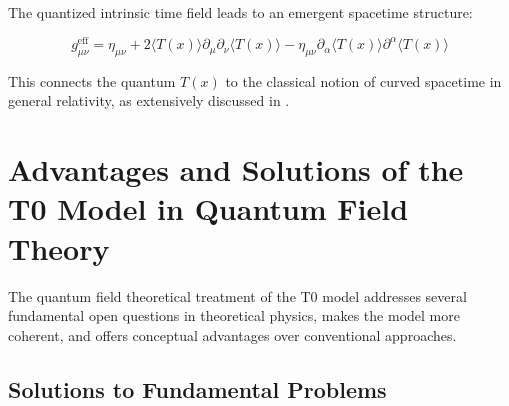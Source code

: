 \documentclass[12pt,a4paper]{article}
\newcommand{\Tfield}{T(x)}
\begin{document}
	The quantized intrinsic time field leads to an emergent spacetime structure:
	
	\begin{equation}
		g_{\mu\nu}^{\text{eff}} = \eta_{\mu\nu} + 2\langle \Tfield \rangle \partial_{\mu}\partial_{\nu}\langle \Tfield \rangle - \eta_{\mu\nu}\partial_{\alpha}\langle \Tfield \rangle \partial^{\alpha}\langle \Tfield \rangle
	\end{equation}
	
	This connects the quantum $\Tfield$ to the classical notion of curved spacetime in general relativity, as extensively discussed in \cite{pascher_emergente_gravitation_2025_en}.
	
	\section{Advantages and Solutions of the T0 Model in Quantum Field Theory}
	\label{sec:vorteile_loesungen}
	
	The quantum field theoretical treatment of the T0 model addresses several fundamental open questions in theoretical physics, makes the model more coherent, and offers conceptual advantages over conventional approaches.
	
	\subsection{Solutions to Fundamental Problems}
	\label{sec:loesungen_probleme}
	
\end{document}
